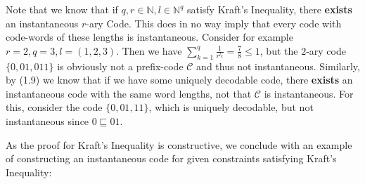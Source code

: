\documentclass[12pt]{article}
\newenvironment{statement2}[2]{\begin{trivlist}
\item[\hskip \labelsep {\bfseries #1}\hskip \labelsep {\bfseries #2}]}{\end{trivlist}}
\begin{document}
\begin{statement2}{(1.10)}{Remark.}
    Note that we know that if $q,r \in \mathbb{N}, l \in \mathbb{N}^q$
    satisfy Kraft's Inequality, there \textbf{exists} an instantaneous $r$-ary Code. This does in no way imply
    that every code with code-words of these lengths is instantaneous. Consider for example
    $r = 2, q = 3, l = (1,2,3)$. Then we have $\sum_{k=1}^{q} \frac{1}{r^{l_k}} = \frac{7}{8} \leq 1$,
    but the $2$-ary code $\{0, 01, 011\}$ is obviously not a prefix-code $\mathcal{C}$ and thus not instantaneous.
    Similarly, by (1.9) we know that if we have some uniquely decodable code, there \textbf{exists} an
    instantaneous code with the same word lengths, not that $\mathcal{C}$ is instantaneous. For this,
    consider the code $\{0,01,11\}$, which is uniquely decodable, but not instantaneous since $0 \sqsubseteq 01$.
\end{statement2}

As the proof for Kraft's Inequality is constructive, we conclude with an example of constructing an instantaneous code
for given constraints satisfying Kraft's Inequality:
\end{document}
